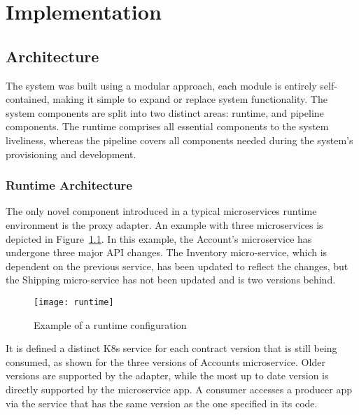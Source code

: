 
%

\chapter{Implementation}
\label{cha:implementation}

\section{Architecture} %
\label{sec:architecture}
The system was built using a modular approach,
each module is entirely self-contained, making it simple to expand or replace system functionality.
The system components are split into two distinct areas: runtime, and pipeline components.
The runtime comprises all essential components to the system liveliness,
whereas the pipeline covers all components needed during the system's provisioning and development.

\subsection{Runtime Architecture} %
\label{sec:runtime_architecture}

The only novel component introduced in a typical microservices runtime environment is the proxy adapter.
An example with three microservices is depicted in Figure~\ref{fig:runtime}.
In this example, the Account's microservice has undergone three major API changes.
The Inventory micro-service, which is dependent on the previous service, has been updated to reflect the changes, but the Shipping micro-service has not been updated and is two versions behind.

\begin{figure}[htbp]
    \centering
    \texttt{[image: runtime]}
    \caption{Example of a runtime configuration}
    \label{fig:runtime}
\end{figure}

It is defined a distinct K8s service for each contract version that is still being consumed, as shown for the three versions of Accounts microservice.
Older versions are supported by the adapter, while the most up to date version is directly supported by the microservice app.
A consumer accesses a producer app via the service that has the same version as the one specified in its code.

